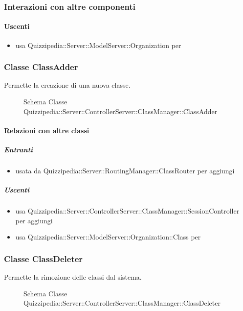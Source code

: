 \subsubsection{Interazioni con altre componenti}
\paragraph{Uscenti}
\begin{itemize}
\item usa Quizzipedia::Server::ModelServer::Organization per 
\end{itemize}
\subsubsection{Classe ClassAdder}
Permette la creazione di una nuova classe.
\begin{figure}[H]
\centering
\noindent{}
\caption[Schema Classe ClassAdder]{Schema Classe Quizzipedia::Server::ControllerServer::ClassManager::ClassAdder}
\end{figure}
\paragraph{Relazioni con altre classi}
\subparagraph{Entranti}
\begin{itemize}
\item usata da Quizzipedia::Server::RoutingManager::ClassRouter per aggiungi
\end{itemize}
\subparagraph{Uscenti}
\begin{itemize}
\item usa Quizzipedia::Server::ControllerServer::ClassManager::SessionController per aggiungi
\item usa Quizzipedia::Server::ModelServer::Organization::Class per 
\end{itemize}
\subsubsection{Classe ClassDeleter}
Permette la rimozione delle classi dal sistema.
\begin{figure}[H]
\centering
\noindent{}
\caption[Schema Classe ClassDeleter]{Schema Classe Quizzipedia::Server::ControllerServer::ClassManager::ClassDeleter}
\end{figure}
